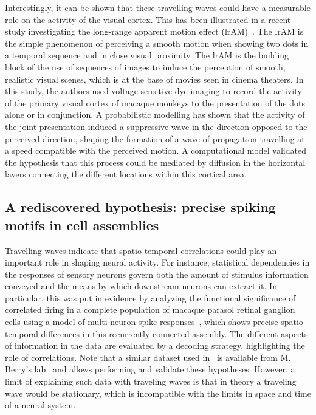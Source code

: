 \documentclass[brainsci, %
               review,submit,pdftex,moreauthors
               ]{Definitions/mdpi}
\begin{document}
Interestingly, it can be shown that these travelling waves could have a measurable role on the activity of the visual cortex. This has been illustrated in a recent study investigating the long-range apparent motion effect (lrAM)~\citep{chemla_suppressive_2019}. The lrAM is the simple phenomenon of perceiving a smooth motion when showing two dots in a temporal sequence and in close visual proximity. The lrAM is the building block of the use of sequences of images to induce the perception of smooth, realistic visual scenes, which is at the base of movies seen in cinema theaters. In this study, the authors used voltage-sensitive dye imaging to record the activity of the primary visual cortex of macaque monkeys to the presentation of the dots alone or in conjunction. A probabilistic modelling has shown that the activity of the joint presentation induced a suppressive wave in the direction opposed to the perceived direction, shaping the formation of a wave of propagation travelling at a speed compatible with the perceived motion. A computational model validated the hypothesis that this process could be mediated by diffusion in the horizontal layers connecting the different locations within this cortical area.
%
%
\subsection{A rediscovered hypothesis: precise spiking motifs in cell assemblies}
Travelling waves indicate that spatio-temporal correlations could play an important role in shaping neural activity. For instance, statistical dependencies in the responses of sensory neurons govern both the amount of stimulus information conveyed and the means by which downstream neurons can extract it. In particular, this was put in evidence by analyzing the functional significance of correlated firing in a complete population of macaque parasol retinal ganglion cells using a model of multi-neuron spike responses~\citep{pillow_spatio-temporal_2008}, which shows precise spatio-temporal differences in this recurrently connected assembly. The different aspects of information in the data are evaluated by a decoding strategy, highlighting the role of correlations. Note that a similar dataset used in~\citep{schneidman_weak_2006} is available from M. Berry's lab~\citep{berry_spike_2022} and allows performing and validate these hypotheses. However, a limit of explaining such data with traveling waves is that in theory a traveling wave would be stationary, which is incompatible with the limits in space and time of a neural system. 
\end{document}
